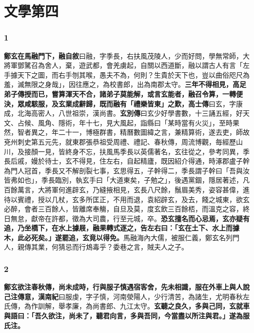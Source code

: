 \chapter{文學第四}

\subsection*{1}

\textbf{鄭玄在馬融門下，}{\footnotesize \textbf{融自敘}曰融，字季長，右扶風茂陵人，少而好問，學無常師，大將軍鄧騭召為舍人，棄，遊武都，會羌虜起，自關以西道斷，融以謂古人有言「左手據天下之圖，而右手刎其喉，愚夫不為，何則？生貴於天下也，豈以曲俗咫尺為羞，滅無限之身哉」，因往應之，為校書郎，出為南郡太守。}\textbf{三年不得相見，高足弟子傳授而已，嘗算渾天不合，諸弟子莫能解，或言玄能者，融召令算，一轉便決，眾咸駭服，及玄業成辭歸，既而融有「禮樂皆東」之歎，}{\footnotesize \textbf{高士傳}曰玄，字康成，北海高密人，八世祖崇，漢尚書。\textbf{玄別傳}曰玄少好學書數，十三誦五經，好天文、占候、風角、隱術，年十七，見大風起，詣縣曰「某時當有火災」，至時果然，智者異之，年二十一，博極群書，精曆數圖緯之言，兼精算術，遂去吏，師故兗州刺史第五元先，就東郡張恭祖受周禮、禮記、春秋傳，周流博觀，毎經歷山川，及接顏一見，皆終身不忘，扶風馬季長以英儒著名，玄往從之，參考同異，季長后戚，嫚於待士，玄不得見，住左右，自起精廬，既因紹介得通，時涿郡盧子幹為門人冠首，季長又不解剖裂七事，玄思得五，子幹得二，季長謂子幹曰「吾與汝皆弗如也」，季長臨別，執玄手曰「大道東矣，子勉之」，後遇黨錮，隱居著述，凡百餘萬言，大將軍何進辟玄，乃縫掖相見，玄長八尺餘，鬚眉美秀，姿容甚偉，進待以賓禮，授以几杖，玄多所匡正，不用而退，袁紹辟玄，及去，餞之城東，欲玄必醉，會者三百餘人，皆離席奉觴，自旦及莫，度玄飲三百餘桮，而溫克之容，終日無怠，獻帝在許都，徵為大司農，行至元城，卒。}\textbf{恐玄擅名而心忌焉，玄亦疑有追，乃坐橋下，在水上據屐，融果轉式逐之，告左右曰：「玄在土下、水上而據木，此必死矣。」遂罷追，玄竟以得免。}{\footnotesize 馬融海內大儒，被服仁義，鄭玄名列門人，親傳其業，何猜忌而行鴆毒乎？委巷之言，賊夫人之子。}

\subsection*{2}

\textbf{鄭玄欲注春秋傳，尚未成時，行與服子慎遇宿客舍，先未相識，服在外車上與人說己注傳意，}{\footnotesize \textbf{漢南紀}曰服虔，字子慎，河南滎陽人，少行清苦，為諸生，尤明春秋左氏傳，為作訓解，舉孝廉，為尚書郎、九江太守。}\textbf{玄聽之良久，多與己同，玄就車與語曰：「吾久欲注，尚未了，聽君向言，多與吾同，今當盡以所注與君。」遂為服氏注。}


